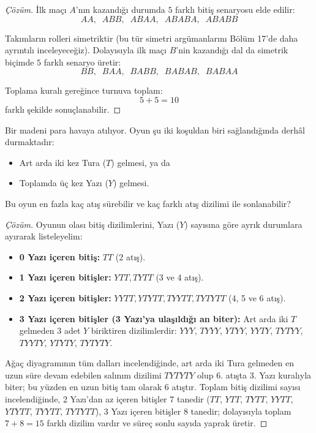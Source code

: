 \begin{proof}[Çözüm]
İlk maçı $A$'nın kazandığı durumda $5$ farklı bitiş senaryosu elde edilir:
\[ AA, \;\; ABB, \;\; ABAA, \;\; ABABA, \;\; ABABB \]

Takımların rolleri simetriktir (bu tür simetri argümanlarını Bölüm 17'de daha ayrıntılı inceleyeceğiz). Dolayısıyla ilk maçı $B$'nin kazandığı dal da simetrik biçimde $5$ farklı senaryo üretir:
\[ BB, \;\; BAA, \;\; BABB, \;\; BABAB, \;\; BABAA \]

Toplama kuralı gereğince turnuva toplam:
\[ 5 + 5 = 10 \]
farklı şekilde sonuçlanabilir.
\end{proof}

\begin{example}
Bir madeni para havaya atılıyor. Oyun şu iki koşuldan biri sağlandığında derhâl durmaktadır:
\begin{itemize}
  \item Art arda iki kez Tura ($T$) gelmesi, ya da
  \item Toplamda üç kez Yazı ($Y$) gelmesi.
\end{itemize}
Bu oyun en fazla kaç atış sürebilir ve kaç farklı atış dizilimi ile sonlanabilir?
\end{example}
\begin{proof}[Çözüm]
Oyunun olası bitiş dizilimlerini, Yazı ($Y$) sayısına göre ayrık durumlara ayırarak listeleyelim:
\begin{itemize}
  \item \textbf{0 Yazı içeren bitiş:} $TT$ (2 atış).
  \item \textbf{1 Yazı içeren bitişler:} $YTT, TYTT$ (3 ve 4 atış).
  \item \textbf{2 Yazı içeren bitişler:} $YYTT, YTYTT, TYYTT, TYTYTT$ (4, 5 ve 6 atış).
  \item \textbf{3 Yazı içeren bitişler (3 Yazı'ya ulaşıldığı an biter):}
  Art arda iki $T$ gelmeden $3$ adet $Y$ biriktiren dizilimlerdir:
$YYY$, $TYYY$, $YTYY$, $YYTY$, $TYTYY$, $TYYTY$, $YTYTY$, $TYTYTY$.
\end{itemize}
Ağaç diyagramının tüm dalları incelendiğinde, art arda iki Tura gelmeden en uzun süre devam edebilen salınım dizilimi $TYTYTY$ olup 6. atışta 3. Yazı kuralıyla biter; bu yüzden en uzun bitiş tam olarak 6 atıştır. Toplam bitiş dizilimi sayısı incelendiğinde, 2 Yazı'dan az içeren bitişler 7 tanedir ($TT$, $YTT$, $TYTT$, $YYTT$, $YTYTT$, $TYYTT$, $TYTYTT$), 3 Yazı içeren bitişler 8 tanedir; dolayısıyla toplam $7 + 8 = 15$ farklı dizilim vardır ve süreç sonlu sayıda yaprak üretir.
\end{proof}

